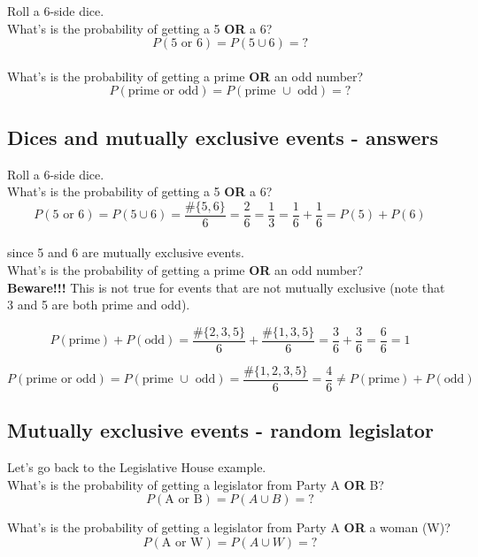 \documentclass[11pt]{article}
\begin{document}
	Roll a 6-side dice.\\
	
	What's is the probability of getting a 5 \textbf{OR} a 6?\\
	\[P(\text{5 or 6}) = P(5 \cup 6) = ?\]\\
	
	What's is the probability of getting a prime \textbf{OR} an odd number?\\
	\[P(\text{prime or odd}) = P(\text{prime }\cup\text{ odd}) = ?\]

	\subsection*{Dices and mutually exclusive events - answers}

	Roll a 6-side dice.\\
	
	What's is the probability of getting a 5 \textbf{OR} a 6?\\
	\[P(\text{5 or 6}) = P(5 \cup 6) = \frac{\#\{5, 6\}}{6} = \frac{2}{6} = \frac{1}{3} = \frac{1}{6} + \frac{1}{6} = P(5) + P(6)\]\\ 
	since 5 and 6 are mutually exclusive events.\\
	
	What's is the probability of getting a prime \textbf{OR} an odd number?\\

	\textbf{Beware!!!} This is not true for events that are not mutually exclusive (note that 3 and 5 are both prime and odd).

	\[P(\text{prime}) + P(\text{odd}) = \frac{\#\{2, 3, 5\}}{6} + \frac{\#\{1, 3, 5\}}{6} = \frac{3}{6} + \frac{3}{6} = \frac{6}{6} = 1\]
	
	\[P(\text{prime or odd}) = P(\text{prime }\cup\text{ odd}) = \frac{\#\{1, 2, 3, 5\}}{6} = \frac{4}{6} \neq P(\text{prime}) + P(\text{odd})\]


	\subsection*{Mutually exclusive events - random legislator}

	Let's go back to the Legislative House example.\\
	
	What's is the probability of getting a legislator from Party A \textbf{OR} B?
	\[P(\text{A or B}) = P(A \cup B) = ?\]
	
	What's is the probability of getting a legislator from Party A \textbf{OR} a woman (W)?
	\[P(\text{A or W}) = P(A \cup W) =?\]
\end{document}
